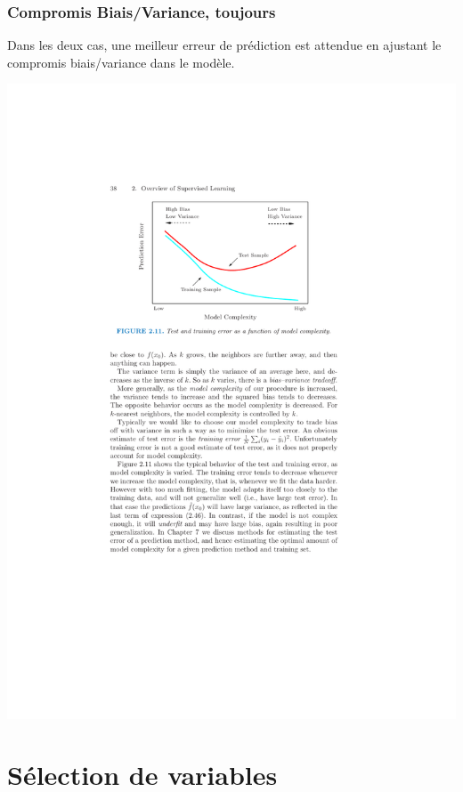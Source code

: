 \documentclass{beamer}\usepackage[]{graphicx}\usepackage[]{color}
\begin{document}
\begin{frame}
  \frametitle{Compromis Biais/Variance, toujours}

  Dans les deux cas, une meilleur erreur de prédiction est attendue en ajustant le \alert{compromis biais/variance} dans le modèle.

  \vfill

  \begin{center}
    \includegraphics{figures/tradeoff}
  \end{center}

\end{frame}

\section{Sélection de variables}
\end{document}
